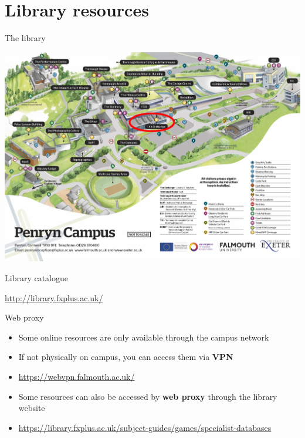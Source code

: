 \part{Library resources}
\frame{\partpage}

\begin{frame}{The library}
	\begin{center}
		\includegraphics[height=0.7\textheight]{campus_map}
	\end{center}
\end{frame}

\begin{frame}{Library catalogue}
	\begin{center}
		\url{http://library.fxplus.ac.uk/}
	\end{center}
\end{frame}

\begin{frame}{Web proxy}
    \begin{itemize}
        \pause\item Some online resources are only available through the campus network
        \pause\item If not physically on campus, you can access them via \textbf{VPN}
        \pause\item \url{https://webvpn.falmouth.ac.uk/}
        \pause\item Some resources can also be accessed by \textbf{web proxy} through the library website
        \pause\item \url{https://library.fxplus.ac.uk/subject-guides/games/specialist-databases}
	\end{itemize}
\end{frame}

